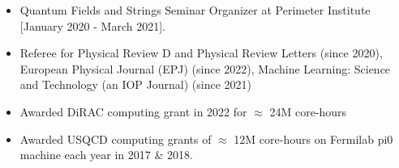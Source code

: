 \renewcommand{\arraystretch}{1.1}

	\begin{itemize}
	\vspace{1mm} 
	 \item Quantum Fields and Strings Seminar Organizer at Perimeter Institute [January 2020 - March 2021].
	  \item Referee for Physical Review D and Physical Review Letters (since 2020), European Physical Journal (EPJ) (since 2022), Machine Learning: Science and Technology (an IOP Journal) (since 2021)
	  \item Awarded DiRAC computing grant in 2022 for $\approx$ 24M core-hours
	  \item Awarded USQCD computing grants of $\approx$ 12M core-hours on Fermilab pi0 machine each year in 2017 \& 2018. 
	  
	  \end{itemize}

